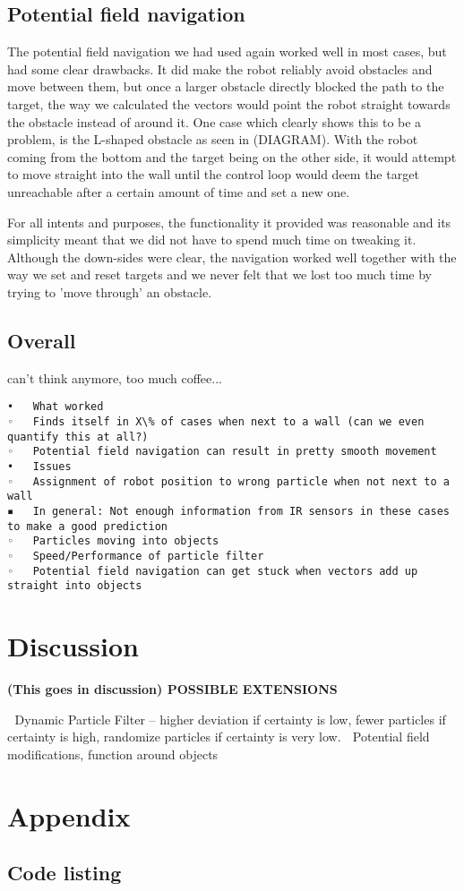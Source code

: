 \documentclass[paper=a4, fontsize=12pt]{scrartcl}	%
\numberwithin{equation}{section}		%
\numberwithin{figure}{section}			%
\numberwithin{table}{section}				%
\begin{document}
\subsection{Potential field navigation}
The potential field navigation we had used again worked well in most cases, but had some clear drawbacks. It did make the robot reliably avoid obstacles and move between them, but once a larger obstacle directly blocked the path to the target, the way we calculated the vectors would point the robot straight towards the obstacle instead of around it. One case which clearly shows this to be a problem, is the L-shaped obstacle as seen in (DIAGRAM). With the robot coming from the bottom and the target being on the other side, it would attempt to move straight into the wall until the control loop would deem the target unreachable after a certain amount of time and set a new one.

For all intents and purposes, the functionality it provided was reasonable and its simplicity meant that we did not have to spend much time on tweaking it. Although the down-sides were clear, the navigation worked well together with the way we set and reset targets and we never felt that we lost too much time by trying to 'move through' an obstacle.

\subsection{Overall}
can't think anymore, too much coffee...

\begin{verbatim}
•	What worked
◦	Finds itself in X\% of cases when next to a wall (can we even quantify this at all?)
◦	Potential field navigation can result in pretty smooth movement
•	Issues
◦	Assignment of robot position to wrong particle when not next to a wall
▪	In general: Not enough information from IR sensors in these cases to make a good prediction
◦	Particles moving into objects
◦	Speed/Performance of particle filter
◦	Potential field navigation can get stuck when vectors add up straight into objects
\end{verbatim}

\section{Discussion}
\textbf{(This goes in discussion) POSSIBLE EXTENSIONS}

	Dynamic Particle Filter – higher deviation if certainty is low, fewer particles if certainty is high, randomize particles if certainty is very low.
	Potential field modifications, function around objects
\section{Appendix}
\subsection{Code listing}

\end{document}
